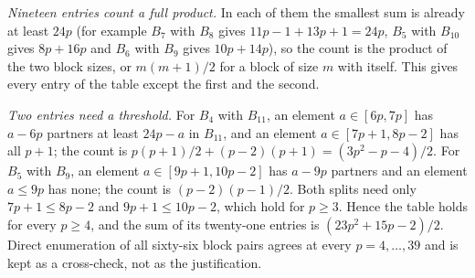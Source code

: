 \documentclass[11pt]{article}
\theoremstyle{definition}
\theoremstyle{remark}
\begin{document}
\emph{Nineteen entries count a full product.} In each of them the smallest sum is already at least
$24p$ (for example $B_7$ with $B_8$ gives $11p-1+13p+1=24p$, $B_5$ with $B_{10}$ gives $8p+16p$ and
$B_6$ with $B_9$ gives $10p+14p$), so the count is the product of the two block sizes, or
$m(m+1)/2$ for a block of size $m$ with itself. This gives every entry of the table except the
first and the second.

\emph{Two entries need a threshold.} For $B_4$ with $B_{11}$, an element $a\in[6p,7p]$ has $a-6p$
partners at least $24p-a$ in $B_{11}$, and an element $a\in[7p+1,8p-2]$ has all $p+1$; the count
is $p(p+1)/2+(p-2)(p+1)=(3p^2-p-4)/2$. For $B_5$ with $B_9$, an element $a\in[9p+1,10p-2]$ has
$a-9p$ partners and an element $a\leq9p$ has none; the count is $(p-2)(p-1)/2$. Both splits need
only $7p+1\leq8p-2$ and $9p+1\leq10p-2$, which hold for $p\geq3$. Hence the table holds for every
$p\geq4$, and the sum of its twenty-one entries is $(23p^2+15p-2)/2$. Direct enumeration of all
sixty-six block pairs agrees at every $p=4,\ldots,39$ and is kept as a cross-check, not as the
justification.
\end{document}
